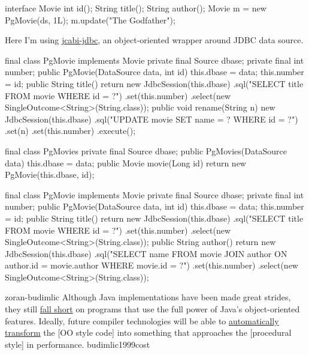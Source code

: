 \documentclass{article}
\begin{document}
\begin{pptWide}{2}
{\small\begin{ffcode}
interface Movie {
  int id();
  String title();
  String author();
}
Movie m = new PgMovie(ds, 1L);
m.update("The Godfather");
\end{ffcode}
}
\par
Here I'm using \href{https://github.com/jcabi/jcabi-jdbc}{jcabi-jdbc},
an object-oriented wrapper around JDBC data source.
\par\columnbreak\par
{\scriptsize\begin{ffcode}
final class PgMovie implements Movie
  private final Source dbase;
  private final int number;
  public PgMovie(DataSource data, int id)
    this.dbase = data;
    this.number = id;
  public String title()
    return new JdbcSession(this.dbase)
      .sql("SELECT title FROM movie WHERE id = ?")
      .set(this.number)
      .select(new SingleOutcome<String>(String.class));
  public void rename(String n)
    new JdbcSession(this.dbase)
      .sql("UPDATE movie SET name = ? WHERE id = ?")
      .set(n)
      .set(this.number)
      .execute();
\end{ffcode}
}
\end{pptWide}
\par
\plush{}

\begin{pptWide}{2}
{\small\begin{ffcode}
final class PgMovies
  private final Source dbase;
  public PgMovies(DataSource data)
    this.dbase = data;
  public Movie movie(Long id)
    return new PgMovie(this.dbase, id);
\end{ffcode}
}
\par\columnbreak\par
{\scriptsize\begin{ffcode}
final class PgMovie implements Movie
  private final Source dbase;
  private final int number;
  public PgMovie(DataSource data, int id)
    this.dbase = data;
    this.number = id;
  public String title()
    return new JdbcSession(this.dbase)
      .sql("SELECT title FROM movie WHERE id = ?")
      .set(this.number)
      .select(new SingleOutcome<String>(String.class));
  public String author()
    return new JdbcSession(this.dbase)
      .sql("SELECT name FROM movie JOIN author ON author.id = movie.author WHERE movie.id = ?")
      .set(this.number)
      .select(new SingleOutcome<String>(String.class));
\end{ffcode}
}
\end{pptWide}
\par
\plush{}



\qte
  {zoran-budimlic}
  {Although Java implementations have been made great strides, they still \ul{fall short} on programs that use the full power of Java's object-oriented features. Ideally, future compiler technologies will be able to \ul{automatically transform} the [OO style code] into something that approaches the [procedural style] in performance.}
  {budimlic1999cost}
\end{document}
